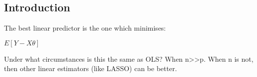 
\subsection{Introduction}

The best linear predictor is the one which minimises:

\(E[Y-X\theta ]\)

Under what circumstances is this the same as OLS? When n>>p. When n is not, then other linear estimators (like LASSO) can be better.

